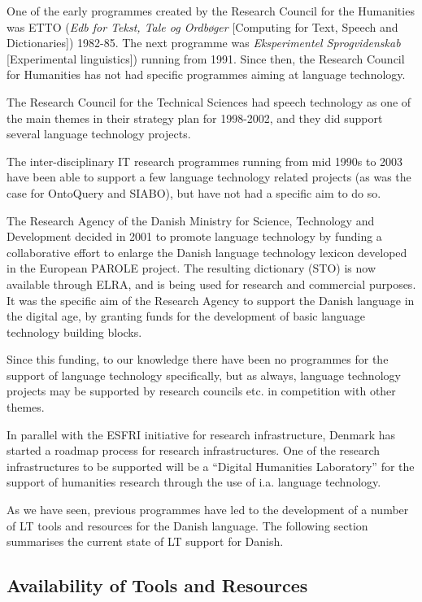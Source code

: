 \begin{multicols}{2}
One of the early programmes created by the Research Council for the Humanities was ETTO ({\it Edb for Tekst, Tale og Ordb\o ger} [Computing for Text, Speech and Dictionaries]) 1982-85. The next programme was {\it Eksperimentel Sprogvidenskab} [Experimental linguistics]) running from 1991. Since then, the Research Council for Humanities has not had specific programmes aiming at language technology.

The Research Council for the Technical Sciences had speech technology as one of the main themes in their strategy plan for 1998-2002, and they did support several language technology projects.

The inter-disciplinary IT research programmes running from mid 1990s to 2003 have been able to support a few language technology related projects (as was the case for OntoQuery and SIABO), but have not had a specific aim to do so.

The Research Agency of the Danish Ministry for Science, Technology and Development decided in 2001 to promote language technology by funding a collaborative effort to enlarge the Danish language technology lexicon developed in the European PAROLE project. The resulting dictionary (STO) is now available through ELRA, and is being used for research and commercial purposes. It was the specific aim of the Research Agency to support the Danish language in the digital age, by granting funds for the development of basic language technology building blocks.

Since this funding, to our knowledge there have been no programmes for the support of language technology specifically, but as always, language technology projects may be supported by research councils etc. in competition with other themes.

In parallel with the ESFRI initiative for research infrastructure, Denmark has started a roadmap process for research infrastructures. One of the research infrastructures to be supported will be a “Digital Humanities Laboratory” for the support of humanities research through the use of i.a. language technology.


As we have seen, previous programmes have led to the development of a number of LT tools and resources for the Danish language. The following section summarises the current state of LT support for Danish.
  
\subsection{Availability of Tools and Resources}


\end{multicols}
